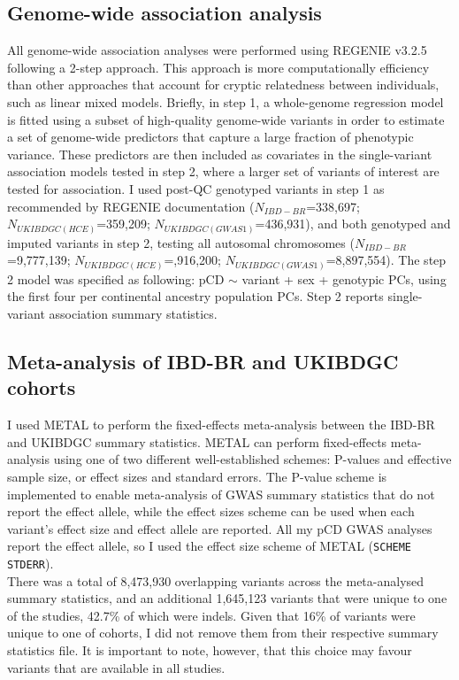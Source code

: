 \subsection{Genome-wide association analysis}
All genome-wide association analyses were performed using REGENIE v3.2.5 \cite{Mbatchou2021-qm} following a 2-step approach. This approach is more computationally efficiency than other approaches that account for cryptic relatedness between individuals, such as linear mixed models. Briefly, in step 1, a whole-genome regression model is fitted using a subset of high-quality genome-wide variants in order to estimate a set of genome-wide predictors that capture a large fraction of phenotypic variance. These predictors are then included as covariates in the single-variant association models tested in step 2, where a larger set of variants of interest are tested for association. I used post-QC genotyped variants in step 1 as recommended by REGENIE documentation ($N_{IBD-BR}$=338,697; $N_{UKIBDGC(HCE)}$=359,209; $N_{UKIBDGC(GWAS1)}$=436,931), and both genotyped and imputed variants in step 2, testing all autosomal chromosomes ($N_{IBD-BR}$=9,777,139; $N_{UKIBDGC(HCE)}$=,916,200; $N_{UKIBDGC(GWAS1)}$=8,897,554). The step 2 model was specified as following: pCD $\sim$ variant + sex + genotypic PCs, using the first four per continental ancestry population PCs. Step 2 reports single-variant association summary statistics. 

\subsection{Meta-analysis of IBD-BR and UKIBDGC cohorts}
I used METAL to perform the fixed-effects meta-analysis between the IBD-BR and UKIBDGC summary statistics.  METAL can perform fixed-effects meta-analysis using one of two different well-established schemes: P-values and effective sample size, or effect sizes and standard errors. The P-value scheme is implemented to enable meta-analysis of GWAS summary statistics that do not report the effect allele, while the effect sizes scheme can be used when each variant's effect size and effect allele are reported. All my pCD GWAS analyses report the effect allele, so I used the effect size scheme of METAL (\Verb+SCHEME STDERR+). \\

There was a total of 8,473,930 overlapping variants across the meta-analysed summary statistics, and an additional 1,645,123 variants that were unique to one of the studies, 42.7\% of which were indels. Given that 16\% of variants were unique to one of cohorts, I did not remove them from their respective summary statistics file. It is important to note, however, that this choice may favour variants that are available in all studies. 

